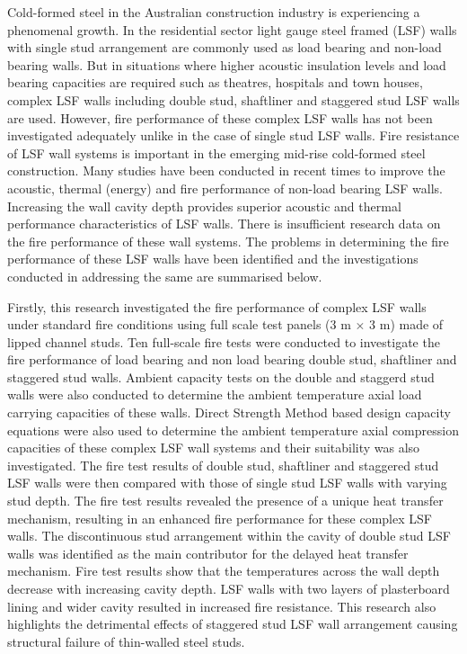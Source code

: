 {

Cold-formed steel in the Australian construction industry is experiencing a phenomenal growth. In the residential sector light gauge steel framed (LSF) walls with single stud arrangement are commonly used as load bearing and non-load bearing walls. But in situations where higher acoustic insulation levels and load bearing capacities are required such as theatres, hospitals and town houses, complex LSF walls including double stud, shaftliner and staggered stud LSF walls are used. However, fire performance of these complex LSF walls has not been investigated adequately unlike in the case of single stud LSF walls. Fire resistance of LSF wall systems is important in the emerging mid-rise cold-formed steel construction. Many studies have been conducted in recent times to improve the acoustic, thermal (energy) and fire performance of non-load bearing LSF walls. Increasing the wall cavity depth provides superior acoustic and thermal performance characteristics of LSF walls. There is insufficient research data on the fire performance of these wall systems. The problems in determining the fire performance of these LSF walls have been identified and the investigations conducted in addressing the same are summarised below.   

Firstly, this research investigated the fire performance of complex LSF walls under standard fire conditions using full scale test panels (3 m \(\times\) 3 m) made of lipped channel studs. Ten full-scale fire tests were conducted to investigate the fire performance of load bearing and non load bearing double stud, shaftliner and staggered stud walls. Ambient capacity tests on the double and staggerd stud walls were also conducted to determine the ambient temperature axial load carrying capacities of these walls. Direct Strength Method based design capacity equations were also used to determine the ambient temperature axial compression capacities of these complex LSF wall systems and their suitability was also investigated. The fire test results of double stud, shaftliner and staggered stud LSF walls were then compared with those of single stud LSF walls with varying stud depth. The fire test results revealed the presence of a unique heat transfer mechanism, resulting in an enhanced fire performance for these complex LSF walls. The discontinuous stud arrangement within the cavity of double stud LSF walls was identified as the main contributor for the delayed heat transfer mechanism. Fire test results show that the temperatures across the wall depth decrease with increasing cavity depth. LSF walls with two layers of plasterboard lining and wider cavity resulted in increased fire resistance. This research also highlights the detrimental effects of staggered stud LSF wall arrangement causing structural failure of thin-walled steel studs. 

}
